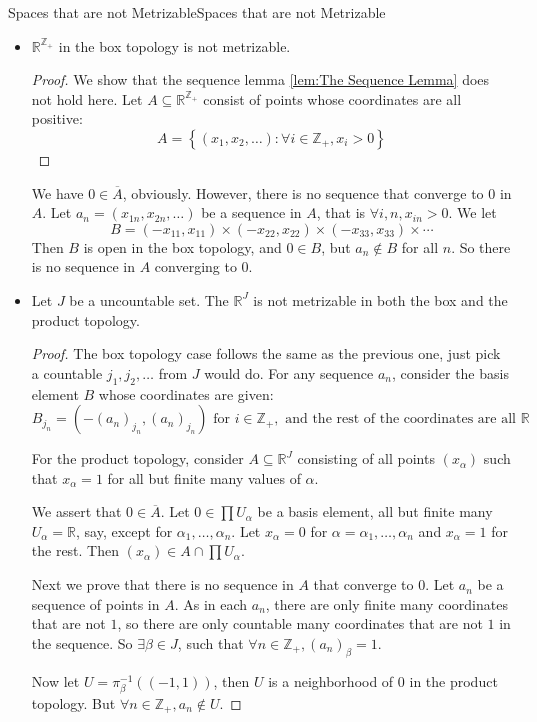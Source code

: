 \documentclass[../main.tex]{subfiles}
\begin{document}
\begin{example}{Spaces that are not Metrizable}{Spaces that are not Metrizable}
\begin{itemize}
\item $\mathbb{R}^{\mathbb{Z}_+}$ in the box topology is not metrizable.
	\begin{proof}
	We show that the sequence lemma \ref{lem:The Sequence Lemma} does not hold here. Let $A \subseteq \mathbb{R}^{\mathbb{Z}_+}$ consist of points whose coordinates are all positive:
	\begin{equation*}
	A = \left\{ (x_1,x_2, \ldots ): \forall i\in \mathbb{Z}_+,x_i>0 \right\}
	\end{equation*}
	\end{proof}
	We have $0\in \overline{A}$, obviously. However, there is no sequence that converge to $0$ in $A$. Let $a_n = (x_{1n}, x_{2n}, \ldots )$ be a sequence in $A$, that is $\forall i,n,x_{in}>0$. We let
	\begin{equation*}
	B = (-x_{11},x_{11}) \times (-x_{22},x_{22}) \times (-x_{33},x_{33}) \times \cdots
	\end{equation*}
	Then $B$ is open in the box topology, and $0\in B$, but $a_n \notin B$ for all $n$. So there is no sequence in $A$ converging to $0$.
\item Let $J$ be a uncountable set. The $\mathbb{R}^J$ is not metrizable in both the box and the product topology.
	\begin{proof}
	The box topology case follows the same as the previous one, just pick a countable $j_1, j_2, \ldots $ from $J$ would do. For any sequence $a_n$, consider the basis element $B$ whose coordinates are given:
	\begin{equation*}
		B_{j_n} = (-(a_n)_{j_n},(a_n)_{j_n}) \text{ for } i\in \mathbb{Z}_+, \text{ and the rest of the coordinates are all } \mathbb{R}
	\end{equation*}

	For the product topology, consider $A \subseteq \mathbb{R}^J$ consisting of all points $(x_{\alpha})$ such that $x_{\alpha}=1$ for all but finite many values of $\alpha$.

	We assert that $0\in \overline{A}$. Let $0\in\prod U_{\alpha}$ be a basis element, all but finite many $U_{\alpha} = \mathbb{R}$, say, except for $\alpha_1, \ldots ,\alpha_n$. Let $x_{\alpha} = 0$ for $\alpha = \alpha_1, \ldots ,\alpha_n$ and $x_{\alpha}=1$ for the rest. Then $(x_{\alpha})\in A\cap \prod U_{\alpha}$.

	Next we prove that there is no sequence in $A$ that converge to $0$. Let $a_n$ be a sequence of points in $A$. As in each $a_n$, there are only finite many coordinates that are not $1$, so there are only countable many coordinates that are not $1$ in the sequence. So $\exists \beta\in J$, such that $\forall n\in \mathbb{Z}_+,(a_n)_{\beta} = 1$. 

	Now let $U = \pi_{\beta}^{-1}((-1,1))$, then $U$ is a neighborhood of $0$ in the product topology. But $\forall n\in \mathbb{Z}_+, a_n \notin U$.
\end{proof}
\end{itemize}
\end{example}
\end{document}
